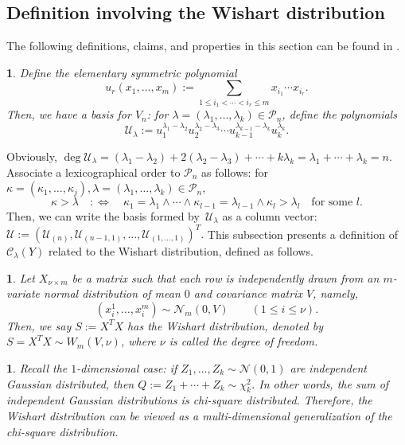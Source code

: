 \documentclass[smallextended]{svjour3}
\newtheorem{defn}[thm]{\protect\definitionname}
\newtheorem{rem}[thm]{\protect\remarkname}
\providecommand{\definitionname}{Definition}
\providecommand{\remarkname}{Remark}
\begin{document}
\subsection{Definition involving the Wishart distribution}\label{sec:Wishart}
The following definitions, claims, and properties in this section
can be found in \cite[pp.~9--22]{Takemura}.
\begin{defn}
Define the elementary symmetric polynomial
\[
  u_{r}(x_{1},\ldots,x_{m}):=\underset{1\leq i_{1}<\cdots<i_{r}\leq m}{\sum}x_{i_{1}}\cdots x_{i_{r}}.
\]
Then, we have a basis for $V_n$: for $\lambda=(\lambda_{1},\ldots,\lambda_{k})\in\mathcal{P}_{n}$, define the polynomials
\[
  \mathcal{U}_{\lambda} :=
  u_{1}^{\lambda_{1}-\lambda_{2}}u_{2}^{\lambda_{2}-\lambda_{3}}\cdots u_{k-1}^{\lambda_{k-1}-\lambda_{k}}u_{k}^{\lambda_{k}}.
\]
\end{defn}
\noindent
Obviously,
$\deg\mathcal{U}_{\lambda} =
  \left(\lambda_{1}-\lambda_{2}\right)+2\left(\lambda_{2}-\lambda_{3}\right)+\cdots+k\lambda_{k} =
  \lambda_{1}+\cdots+\lambda_{k}=n$.
Associate a lexicographical order to $\mathcal{P}_{n}$ as follows:
for $\kappa=\left(\kappa_1,\ldots,\kappa_j\right),\lambda=\left(\lambda_1,\ldots,\lambda_k\right)\in\mathcal{P}_{n}$,
\[
  \kappa>\lambda \quad:\Leftrightarrow\quad
  \kappa_1=\lambda_1\land\cdots\land\kappa_{l-1}=\lambda_{l-1}\land\kappa_{l}>\lambda_{l}
  \quad\text{for some }l.
\]
Then, we can write the basis formed by~$\mathcal{U}_{\lambda}$
as a column vector:
$
\mathcal{U}:=(\mathcal{U}_{(n)},\allowbreak \mathcal{U}_{(n-1,1)},\ldots,\mathcal{U}_{(1,\ldots,1)})^{T}\!\!\!.
$
This subsection presents a definition of $\mathcal{C}_{\lambda}(Y)$
related to the Wishart distribution, defined as follows.
\begin{defn}
Let $X_{\nu\times m}$ be a matrix such that each row is independently drawn
from an $m$-variate normal distribution of mean $0$ and covariance
matrix $V$, namely, 
\[
  (x_{i}^{1},\ldots,x_{i}^{m})\sim\mathcal{N}_{m}(0,V)
  \qquad (1\leq i\leq\nu).
\]
Then, we say $S:=X^{T}X$ has the Wishart distribution, denoted by $S=X^{T}X\sim W_{m}(V,\nu)$, where $\nu$ is called the degree of freedom.
\end{defn}
\begin{rem}
Recall the $1$-dimensional case: if $Z_{1},\ldots,Z_{k}\sim\mathcal{N}(0,1)$
are independent Gaussian distributed, then $Q:=Z_{1}+\cdots+Z_{k}\sim\chi_{k}^{2}$.
In other words, the sum of independent Gaussian distributions is chi-square
distributed. Therefore, the Wishart distribution can be viewed as a multi-dimensional
generalization of the chi-square distribution.
\end{rem}
\end{document}
